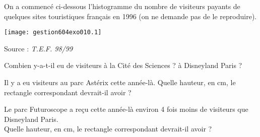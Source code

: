 On a commencé ci-dessous l'histogramme du nombre de visiteurs payants
de quelques sites touristiques français en 1996 (on ne demande pas
de le reproduire).
\begin{center}
\texttt{[image: gestion604exo010.1]}
\par\hfill Source : {\em T.E.F. 98/99}
\end{center}
\begin{myenumerate}
  \item Combien y-a-t-il eu de visiteurs à la Cité des Sciences ? à
  Disneyland Paris ?
\item Il y a eu  visiteurs au parc Astérix cette
  année-là. Quelle hauteur, en cm, le rectangle correspondant
  devrait-il avoir ?
\item Le parc Futuroscope a reçu cette année-là environ 4 fois
  moins de visiteurs que Disneyland Paris.\\Quelle hauteur, en cm, le
  rectangle correspondant devrait-il avoir ?
\end{myenumerate}